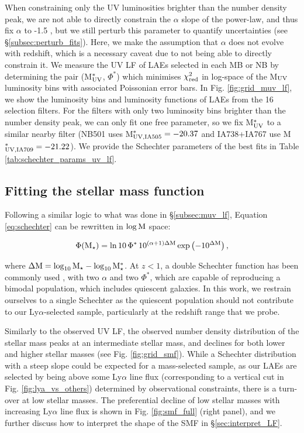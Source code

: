 \documentclass[a4paper,fleqn,usenatbib]{mnras}
\begin{document}
When constraining only the UV luminosities brighter than the number density peak, we are not able to directly constrain the $\alpha$ slope of the power-law, and thus fix $\alpha$ to -1.5 \citep[similar to the UV LF of LAEs from e.g.][]{Ouchi2008}, but we still perturb this parameter to quantify uncertainties (see \S\ref{subsec:perturb_fits}). Here, we make the assumption that $\alpha$ does not evolve with redshift, which is a necessary caveat due to not being able to directly constrain it. We measure the UV LF of LAEs selected in each MB or NB by determining the pair (M$_{\rm UV}^*$, $\Phi^*$) which minimises $\chi^2_{\rm red}$ in log-space of the M$_{\rm UV}$ luminosity bins with associated Poissonian error bars. In Fig. \ref{fig:grid_muv_lf}, we show the luminosity bins and luminosity functions of LAEs from the 16 selection filters. For the filters with only two luminosity bins brighter than the number density peak, we can only fit one free parameter, so we fix M$_{\rm UV}^*$ to a similar nearby filter (NB501 uses M$_{\rm UV, IA505}^*=-20.37$ and IA738+IA767 use M$_{\rm UV, IA709}^*=-21.22$). We provide the Schechter parameters of the best fits in Table \ref{tab:schechter_params_uv_lf}.

\subsection{Fitting the stellar mass function} \label{subsec:smf}

Following a similar logic to what was done in \S\ref{subsec:muv_lf}, Equation \ref{eq:schechter} can be rewritten in $\rm\log M$ space:

\begin{eqnarray}
\Phi(\rm M_\star)=\ln 10\,\Phi^*\,10^{(\alpha+1)\Delta M}\exp\left(-10^{\Delta M}\right),
\end{eqnarray}

\noindent where $\rm \Delta M=\log_{10} M_\star-\log_{10} M_\star^*$.  At $z<1$, a double Schechter function has been commonly used \citep[see e.g.][]{Pozzetti2010,Ilbert2013}, with two $\alpha$ and two $\Phi^*$, which are capable of reproducing a bimodal population, which includes quiescent galaxies. In this work, we restrain ourselves to a single Schechter as the quiescent population should not contribute to our Ly$\alpha$-selected sample, particularly at the redshift range that we probe.

Similarly to the observed UV LF, the observed number density distribution of the stellar mass peaks at an intermediate stellar mass, and declines for both lower and higher stellar masses (see Fig. \ref{fig:grid_smf}). While a Schechter distribution with a steep slope could be expected for a mass-selected sample, as our LAEs are selected by being above some Ly$\alpha$ line flux (corresponding to a vertical cut in Fig. \ref{fig:lya_vs_others}) determined by observational constraints, there is a turn-over at low stellar masses. The preferential decline of low stellar masses with increasing Ly$\alpha$ line flux is shown in Fig. \ref{fig:smf_full} (right panel), and we further discuss how to interpret the shape of the SMF in \S\ref{sec:interpret_LF}.
\end{document}
